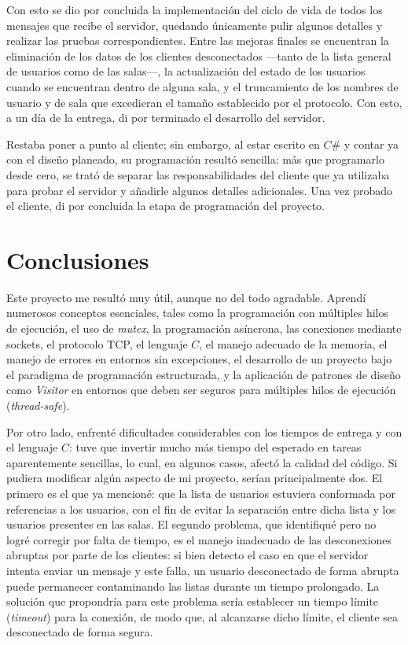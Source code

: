 \documentclass{article}
\begin{document}
    Con esto se dio por concluida la implementación del ciclo de vida de todos los mensajes que recibe el servidor, quedando únicamente pulir algunos detalles y realizar las pruebas correspondientes. Entre las mejoras finales se encuentran la eliminación de los datos de los clientes desconectados —tanto de la lista general de usuarios como de las salas—, la actualización del estado de los usuarios cuando se encuentran dentro de alguna sala, y el truncamiento de los nombres de usuario y de sala que excedieran el tamaño establecido por el protocolo. Con esto, a un día de la entrega, di por terminado el desarrollo del servidor.

    Restaba poner a punto al cliente; sin embargo, al estar escrito en $C\#$ y contar ya con el diseño planeado, su programación resultó sencilla: más que programarlo desde cero, se trató de separar las responsabilidades del cliente que ya utilizaba para probar el servidor y añadirle algunos detalles adicionales. Una vez probado el cliente, di por concluida la etapa de programación del proyecto.

    \section{Conclusiones}

    Este proyecto me resultó muy útil, aunque no del todo agradable. Aprendí numerosos conceptos esenciales, tales como la programación con múltiples hilos de ejecución, el uso de \textit{mutex}, la programación asíncrona, las conexiones mediante sockets, el protocolo TCP, el lenguaje $C$, el manejo adecuado de la memoria, el manejo de errores en entornos sin excepciones, el desarrollo de un proyecto bajo el paradigma de programación estructurada, y la aplicación de patrones de diseño como \textit{Visitor} en entornos que deben ser seguros para múltiples hilos de ejecución (\textit{thread-safe}).

    Por otro lado, enfrenté dificultades considerables con los tiempos de entrega y con el lenguaje $C$: tuve que invertir mucho más tiempo del esperado en tareas aparentemente sencillas, lo cual, en algunos casos, afectó la calidad del código. Si pudiera modificar algún aspecto de mi proyecto, serían principalmente dos. El primero es el que ya mencioné: que la lista de usuarios estuviera conformada por referencias a los usuarios, con el fin de evitar la separación entre dicha lista y los usuarios presentes en las salas. El segundo problema, que identifiqué pero no logré corregir por falta de tiempo, es el manejo inadecuado de las desconexiones abruptas por parte de los clientes: si bien detecto el caso en que el servidor intenta enviar un mensaje y este falla, un usuario desconectado de forma abrupta puede permanecer contaminando las listas durante un tiempo prolongado. La solución que propondría para este problema sería establecer un tiempo límite (\textit{timeout}) para la conexión, de modo que, al alcanzarse dicho límite, el cliente sea desconectado de forma segura.
\end{document}
